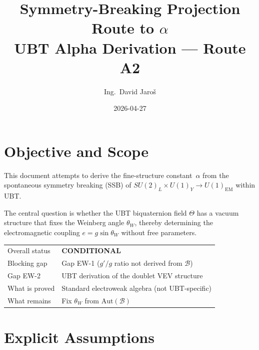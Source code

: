\documentclass[12pt,a4paper]{article}
\title{\textbf{Symmetry-Breaking Projection Route to $\alpha$}\\
         \large UBT Alpha Derivation — Route A2}
\author{Ing.\ David Jaro\v{s}}
\date{2026-04-27}
\theoremstyle{definition}
\theoremstyle{remark}
\begin{document}
  \maketitle
\fi

\section{Objective and Scope}
\label{sec:sb:objective}

This document attempts to derive the fine-structure constant~$\alpha$ from the
spontaneous symmetry breaking (SSB) of $SU(2)_L \times U(1)_Y \to U(1)_{\mathrm{EM}}$
within UBT.

The central question is whether the UBT biquaternion field $\Theta$ has a vacuum
structure that fixes the Weinberg angle $\theta_W$, thereby determining the
electromagnetic coupling $e = g\sin\theta_W$ without free parameters.

\begin{tcolorbox}[colback=blue!4!white, colframe=blue!50!black, title=Route A2 Status]
\begin{tabular}{ll}
Overall status & \textbf{CONDITIONAL} \\
Blocking gap & Gap EW-1 ($g'/g$ ratio not derived from $\mathcal{B}$) \\
Gap EW-2 & UBT derivation of the doublet VEV structure \\
What is proved & Standard electroweak algebra (not UBT-specific) \\
What remains & Fix $\theta_W$ from $\mathrm{Aut}(\mathcal{B})$ \\
\end{tabular}
\end{tcolorbox}

\section{Explicit Assumptions}
\label{sec:sb:assumptions}
\end{document}
